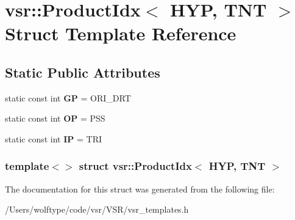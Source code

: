 \hypertarget{structvsr_1_1_product_idx_3_01_h_y_p_00_01_t_n_t_01_4}{\section{vsr\-:\-:Product\-Idx$<$ H\-Y\-P, T\-N\-T $>$ Struct Template Reference}
\label{structvsr_1_1_product_idx_3_01_h_y_p_00_01_t_n_t_01_4}
}
\subsection*{Static Public Attributes}
\begin{DoxyCompactItemize}
\item 
\hypertarget{structvsr_1_1_product_idx_3_01_h_y_p_00_01_t_n_t_01_4_aa05f9a64073f6a32f5ec8b549bfc61cd}{static const int {\bfseries G\-P} = O\-R\-I\-\_\-\-D\-R\-T}\label{structvsr_1_1_product_idx_3_01_h_y_p_00_01_t_n_t_01_4_aa05f9a64073f6a32f5ec8b549bfc61cd}

\item 
\hypertarget{structvsr_1_1_product_idx_3_01_h_y_p_00_01_t_n_t_01_4_ad6fa3f2b7c1c5a0119ad6591e77f37be}{static const int {\bfseries O\-P} = P\-S\-S}\label{structvsr_1_1_product_idx_3_01_h_y_p_00_01_t_n_t_01_4_ad6fa3f2b7c1c5a0119ad6591e77f37be}

\item 
\hypertarget{structvsr_1_1_product_idx_3_01_h_y_p_00_01_t_n_t_01_4_aa14c871dfa332a6e057cbaeb2721f600}{static const int {\bfseries I\-P} = T\-R\-I}\label{structvsr_1_1_product_idx_3_01_h_y_p_00_01_t_n_t_01_4_aa14c871dfa332a6e057cbaeb2721f600}

\end{DoxyCompactItemize}
\subsubsection*{template$<$$>$ struct vsr\-::\-Product\-Idx$<$ H\-Y\-P, T\-N\-T $>$}



The documentation for this struct was generated from the following file\-:\begin{DoxyCompactItemize}
\item 
/\-Users/wolftype/code/vsr/\-V\-S\-R/vsr\-\_\-templates.\-h\end{DoxyCompactItemize}
